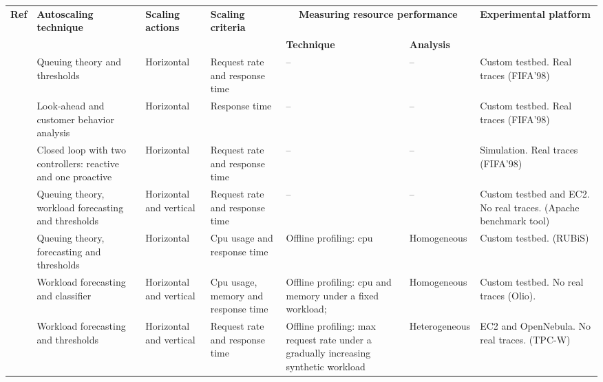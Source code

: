 \begin{table*}\label{Ref_summary}
  {\scriptsize 
    \begin{tabular}{  | p{0.8cm} | p{3cm} | p{1.5cm} | p{3cm} | p{2.6cm} | p{1.4cm} | p{2.5cm} |}
    \hline
\textbf{Ref} & \textbf{Autoscaling technique}  & \textbf{Scaling \newline actions} & \textbf{Scaling criteria} & \multicolumn{2}{|c|}{\textbf{Measuring resource performance}}    & \textbf{Experimental platform} \\ 
 &   &  &  & \textbf{Technique} & \textbf{Analysis}  &  \\ \hline
\textit{\cite{urgaonkar_agile_2008}}   & Queuing theory and thresholds & Horizontal & Request rate and response time &  --  & -- & Custom testbed. \newline Real traces (FIFA'98) \\ \hline
\textit{\cite{roy_efficient_2011}}   & Look-ahead and customer behavior analysis & Horizontal & Response time &  --  & -- & Custom testbed. \newline Real traces (FIFA'98)  \\ \hline
\textit{\cite{ali-eldin_2012}}   & Closed loop with two controllers: reactive and one proactive  & Horizontal & Request rate and response time  & -- & -- & Simulation. \newline Real traces (FIFA'98)  \\ \hline
\textit{\cite{bunch_2012}}   & Queuing theory, workload forecasting and thresholds  & Horizontal and vertical & Request rate and response time  & -- &  --  & Custom testbed and EC2. \newline No real traces. (Apache benchmark tool)\\ \hline
\textit{\cite{roy_2011}}   & Queuing theory, forecasting and thresholds  & Horizontal &  Cpu usage and response time  & Offline profiling: cpu & Homogeneous &  Custom testbed. (RUBiS)  \\ \hline
\textit{\cite{smartscale_2012}}   &  Workload forecasting and classifier & Horizontal and vertical &  Cpu usage, memory and response time & Offline profiling: cpu and memory under a fixed workload; & Homogeneous &  Custom  testbed. \newline No real traces (Olio).  \\ \hline
\textit{\cite{sharma_cost-aware_2011}}   & Workload forecasting and thresholds  & Horizontal and vertical & Request rate and response time  & Offline profiling: max request rate under a gradually increasing synthetic workload & Heterogeneous &  EC2 and OpenNebula. \newline No real traces. (TPC-W) \\ \hline

\end{tabular}}
\end{table*}
